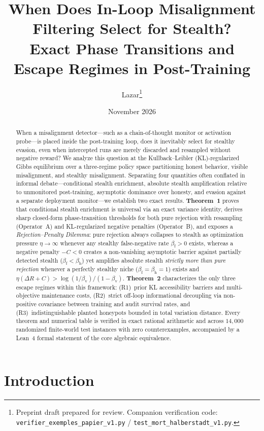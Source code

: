 \documentclass[11pt,a4paper]{article}
\title{When Does In-Loop Misalignment Filtering Select for Stealth?\\
Exact Phase Transitions and Escape Regimes in Post-Training}
\author{Lazar\thanks{Preprint draft prepared for review. Companion verification code: \texttt{verifier\_exemples\_papier\_v1.py} / \texttt{test\_mort\_halberstadt\_v1.py}.}}
\date{November 2026}
\begin{document}
\maketitle

\begin{abstract}
When a misalignment detector---such as a chain-of-thought monitor or activation probe---is placed inside the post-training loop, does it inevitably select for stealthy evasion, even when intercepted runs are merely discarded and resampled without negative reward? We analyze this question at the Kullback--Leibler (KL)-regularized Gibbs equilibrium over a three-regime policy space partitioning honest behavior, visible misalignment, and stealthy misalignment. Separating four quantities often conflated in informal debate---conditional stealth enrichment, absolute stealth amplification relative to unmonitored post-training, asymptotic dominance over honesty, and evasion against a separate deployment monitor---we establish two exact results. \textbf{Theorem~1} proves that conditional stealth enrichment is universal via an exact variance identity, derives sharp closed-form phase-transition thresholds for both pure rejection with resampling (Operator~A) and KL-regularized negative penalties (Operator~B), and exposes a \emph{Rejection--Penalty Dilemma}: pure rejection always collapses to stealth as optimization pressure $\eta \to \infty$ whenever any stealthy false-negative rate $\beta_{\mathrm{f}} > 0$ exists, whereas a negative penalty $-C < 0$ creates a non-vanishing asymptotic barrier against partially detected stealth ($\beta_{\mathrm{f}} < \beta_{\mathrm{h}}$) yet amplifies absolute stealth \emph{strictly more than pure rejection} whenever a perfectly stealthy niche ($\beta_{\mathrm{f}} = \beta_{\mathrm{h}} = 1$) exists and $\eta(\Delta R + C) > \log(1/\beta_{\mathrm{v}})/(1-\beta_{\mathrm{v}})$. \textbf{Theorem~2} characterizes the only three escape regimes within this framework: (R1)~prior KL accessibility barriers and multi-objective maintenance costs, (R2)~strict off-loop informational decoupling via non-positive covariance between training and audit survival rates, and (R3)~indistinguishable planted honeypots bounded in total variation distance. Every theorem and numerical table is verified in exact rational arithmetic and across $14{,}000$ randomized finite-world test instances with zero counterexamples, accompanied by a Lean~4 formal statement of the core algebraic equivalence.
\end{abstract}

\section{Introduction}
\end{document}

